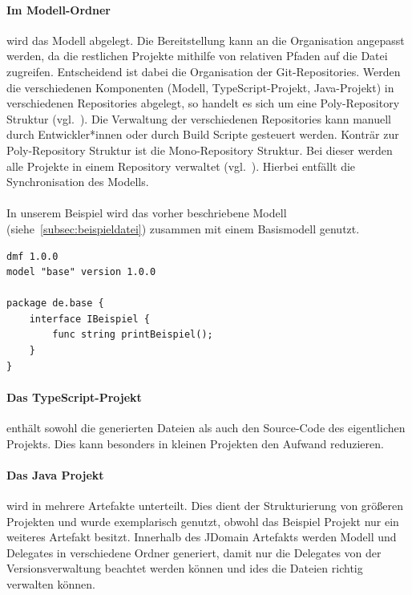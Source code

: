 \documentclass[./einleitung.tex]{subfiles}
\begin{document}
    \paragraph{Im Modell-Ordner} wird das Modell abgelegt.
    Die Bereitstellung kann an die Organisation angepasst werden, da die restlichen Projekte mithilfe von relativen Pfaden auf die Datei zugreifen.
    Entscheidend ist dabei die Organisation der Git-Repositories.
    Werden die verschiedenen Komponenten (Modell, TypeScript-Projekt, Java-Projekt) in verschiedenen Repositories abgelegt, so handelt es sich um eine Poly-Repository Struktur (vgl.~\cite{monorepo}).
    Die Verwaltung der verschiedenen Repositories kann manuell durch Entwickler*innen oder durch Build Scripte gesteuert werden.
    Konträr zur Poly-Repository Struktur ist die Mono-Repository Struktur.
    Bei dieser werden alle Projekte in einem Repository verwaltet (vgl.~\cite{monorepo}).
    Hierbei entfällt die Synchronisation des Modells.
    \\\\
    In unserem Beispiel wird das vorher beschriebene Modell (siehe~\ref{subsec:beispieldatei}) zusammen mit einem Basismodell genutzt.
    \begin{lstlisting}[language=dmf, caption=Das Basismodell, label=lst:basismodell]
dmf 1.0.0
model "base" version 1.0.0

package de.base {
    interface IBeispiel {
        func string printBeispiel();
    }
}
    \end{lstlisting}

    \paragraph{Das TypeScript-Projekt} enthält sowohl die generierten Dateien als auch den Source-Code des eigentlichen Projekts.
    Dies kann besonders in kleinen Projekten den Aufwand reduzieren.

    \paragraph{Das Java Projekt} wird in mehrere Artefakte unterteilt.
    Dies dient der Strukturierung von größeren Projekten und wurde exemplarisch genutzt, obwohl das Beispiel Projekt nur ein weiteres Artefakt besitzt.
    Innerhalb des JDomain Artefakts werden Modell und Delegates in verschiedene Ordner generiert, damit nur die Delegates von der Versionsverwaltung beachtet werden können und \acrshort{ide}s die Dateien richtig verwalten können.
\end{document}

